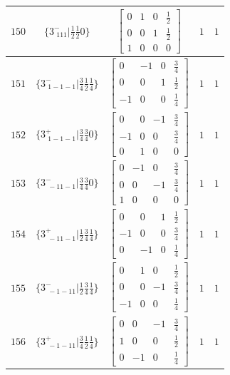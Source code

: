 \documentclass[fleqn,8pt]{jsarticle}
\begin{document}
\begin{longtable}{ccccc}
$ 150 $ & $ \{3^{-}_{\,\,111}|\frac{1}{2} \frac{1}{2} 0\} $ & $ \begin{bmatrix} 0 & 1 & 0 & \frac{1}{2} \\ 0 & 0 & 1 & \frac{1}{2} \\ 1 & 0 & 0 & 0 \end{bmatrix} $ & $ 1 $ & $ 1 $ \\ \hline
$ 151 $ & $ \{3^{-}_{\,\,1-1-1}|\frac{3}{4} \frac{1}{2} \frac{1}{4}\} $ & $ \begin{bmatrix} 0 & -1 & 0 & \frac{3}{4} \\ 0 & 0 & 1 & \frac{1}{2} \\ -1 & 0 & 0 & \frac{1}{4} \end{bmatrix} $ & $ 1 $ & $ 1 $ \\ \hline
$ 152 $ & $ \{3^{+}_{\,\,1-1-1}|\frac{3}{4} \frac{3}{4} 0\} $ & $ \begin{bmatrix} 0 & 0 & -1 & \frac{3}{4} \\ -1 & 0 & 0 & \frac{3}{4} \\ 0 & 1 & 0 & 0 \end{bmatrix} $ & $ 1 $ & $ 1 $ \\ \hline
$ 153 $ & $ \{3^{-}_{\,\,-11-1}|\frac{3}{4} \frac{3}{4} 0\} $ & $ \begin{bmatrix} 0 & -1 & 0 & \frac{3}{4} \\ 0 & 0 & -1 & \frac{3}{4} \\ 1 & 0 & 0 & 0 \end{bmatrix} $ & $ 1 $ & $ 1 $ \\ \hline
$ 154 $ & $ \{3^{+}_{\,\,-11-1}|\frac{1}{2} \frac{3}{4} \frac{1}{4}\} $ & $ \begin{bmatrix} 0 & 0 & 1 & \frac{1}{2} \\ -1 & 0 & 0 & \frac{3}{4} \\ 0 & -1 & 0 & \frac{1}{4} \end{bmatrix} $ & $ 1 $ & $ 1 $ \\ \hline
$ 155 $ & $ \{3^{-}_{\,\,-1-11}|\frac{1}{2} \frac{3}{4} \frac{1}{4}\} $ & $ \begin{bmatrix} 0 & 1 & 0 & \frac{1}{2} \\ 0 & 0 & -1 & \frac{3}{4} \\ -1 & 0 & 0 & \frac{1}{4} \end{bmatrix} $ & $ 1 $ & $ 1 $ \\ \hline
$ 156 $ & $ \{3^{+}_{\,\,-1-11}|\frac{3}{4} \frac{1}{2} \frac{1}{4}\} $ & $ \begin{bmatrix} 0 & 0 & -1 & \frac{3}{4} \\ 1 & 0 & 0 & \frac{1}{2} \\ 0 & -1 & 0 & \frac{1}{4} \end{bmatrix} $ & $ 1 $ & $ 1 $ \\ \hline

\end{longtable}
\end{document}
